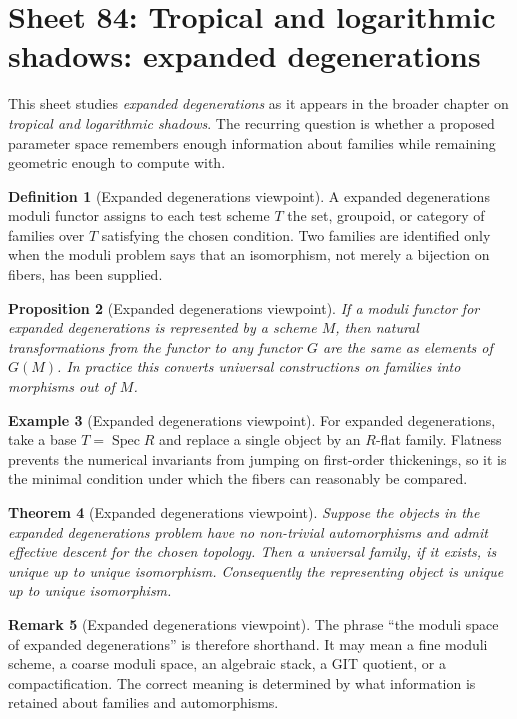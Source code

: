 \documentclass[11pt]{amsart}
\newtheorem{theorem}{Theorem}[section]
\newtheorem{proposition}[theorem]{Proposition}
\theoremstyle{definition}
\newtheorem{definition}[theorem]{Definition}
\newtheorem{example}[theorem]{Example}
\newtheorem{remark}[theorem]{Remark}
\newcommand{\Spec}{\operatorname{Spec}}
\begin{document}
\section{Sheet 84: Tropical and logarithmic shadows: expanded degenerations}
This sheet studies \emph{expanded degenerations} as it appears in the broader chapter on \emph{tropical and logarithmic shadows}.  The recurring question is whether a proposed parameter space remembers enough information about families while remaining geometric enough to compute with.
\begin{definition}[Expanded degenerations viewpoint]
A expanded degenerations moduli functor assigns to each test scheme $T$ the set, groupoid, or category of families over $T$ satisfying the chosen condition.  Two families are identified only when the moduli problem says that an isomorphism, not merely a bijection on fibers, has been supplied.
\end{definition}
\begin{proposition}[Expanded degenerations viewpoint]
If a moduli functor for expanded degenerations is represented by a scheme $M$, then natural transformations from the functor to any functor $G$ are the same as elements of $G(M)$.  In practice this converts universal constructions on families into morphisms out of $M$.
\end{proposition}
\begin{example}[Expanded degenerations viewpoint]
For expanded degenerations, take a base $T=\Spec R$ and replace a single object by an $R$-flat family.  Flatness prevents the numerical invariants from jumping on first-order thickenings, so it is the minimal condition under which the fibers can reasonably be compared.
\end{example}
\begin{theorem}[Expanded degenerations viewpoint]
Suppose the objects in the expanded degenerations problem have no non-trivial automorphisms and admit effective descent for the chosen topology.  Then a universal family, if it exists, is unique up to unique isomorphism.  Consequently the representing object is unique up to unique isomorphism.
\end{theorem}
\begin{remark}[Expanded degenerations viewpoint]
The phrase ``the moduli space of expanded degenerations'' is therefore shorthand.  It may mean a fine moduli scheme, a coarse moduli space, an algebraic stack, a GIT quotient, or a compactification.  The correct meaning is determined by what information is retained about families and automorphisms.
\end{remark}
\end{document}
